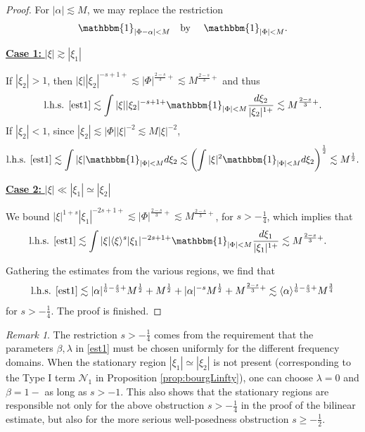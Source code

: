 \documentclass[a4paper,
11pt,  reqno]{amsart}
\newcommand{\fia}{\mathbbm{1}_{|\Phi-\alpha|<M}}
\newcommand{\jap}[1]{\langle #1 \rangle}
\newcommand{\5}{\textup{V}}
\newcommand{\noi}{\noindent}
\newcommand{\les}{\lesssim}
\theoremstyle{remark}
\newtheorem{remark}[theorem]{Remark}
\numberwithin{equation}{section}
\numberwithin{theorem}{section}
\newcommand{\Ncal}{\mathcal{N}}
\begin{document}
\begin{proof}
\smallskip

For $|\alpha|\lesssim M$, we may replace the restriction
$$
\fia \quad \mbox{by }\quad \mathbbm{1}_{|\Phi|<M}.
$$



\smallskip
\noi
\underline{\textbf{Case 1:} $|\xi|\gtrsim |\xi_1|$}

If $|\xi_2|>1$, then
$
|\xi||\xi_2|^{-s+1+}\lesssim |\Phi|^{\frac{2-s}{3}+} \lesssim M^{\frac{2-s}{3}+}
$
and thus
\begin{align}
\text{l.h.s. \eqref{est1}}
\les \int |\xi||\xi_2|^{-s+1+}\mathbbm{1}_{|\Phi|<M}\frac{d\xi_2}{|\xi_2|^{1+}}\lesssim M^{\frac{2-s}{3}+}.
\end{align}
If $|\xi_2|<1$, since $|\xi_2|\lesssim |\Phi||\xi|^{-2}\lesssim M|\xi|^{-2}$,
\begin{align}
\text{l.h.s. \eqref{est1}}
\les \int |\xi|\mathbbm{1}_{|\Phi|<M}d\xi_2\lesssim \left(\int |\xi|^2\mathbbm{1}_{|\Phi|<M} d\xi_2\right)^\frac12\lesssim M^{\frac12}.
\end{align}


\smallskip\noi
\underline{\textbf{Case 2:} $|\xi|\ll |\xi_1|\simeq |\xi_2|$}

We bound
$ |\xi|^{1+s}|\xi_1|^{-2s+1+}\lesssim |\Phi|^{\frac{2-s}{3}+}\lesssim M^{\frac{2-s}{3}+}
$,
for $s>-\frac14$,
which implies that
\begin{align}
\text{l.h.s. \eqref{est1}}
&\les \int |\xi|\jap{\xi}^s|\xi_1|^{-2s+1+}\mathbbm{1}_{|\Phi|<M}\frac{d\xi_1}{|\xi_1|^{1+}}\lesssim  M^{\frac{2-s}{3}+}.
\end{align}

\medskip

Gathering the estimates from the various regions, we find that
\begin{align}
\text{l.h.s. \eqref{est1}}
\lesssim |\alpha|^{\frac16-\frac s3+}M^{\frac12} + M^{\frac12} + |\alpha|^{-s}M^{\frac12} +  M^{\frac{2-s}{3}+} \lesssim \jap{\alpha}^{\frac16-\frac s3+}M^{\frac34}
\end{align}
for $s>-\frac14$. The proof is finished.\qedhere



\end{proof}



\begin{remark}
    The restriction $s>-\frac14$ comes from the requirement that the parameters $\beta,\lambda$ in \eqref{est1} must be chosen uniformly for the different frequency domains. When the stationary region $|\xi_1|\simeq |\xi_2|$ is not present (corresponding to the Type I term $\Ncal_1$ in Proposition \ref{prop:bourgLinfty}), one can choose $\lambda=0$ and $\beta=1-$ as long as $s>-1$.
    This also shows that the stationary regions are responsible not only for the above obstruction $s>-\frac14$ in the proof of the bilinear estimate, but also for the more serious well-posedness obstruction $s\ge -\frac12$.

\end{remark}







\end{document}
